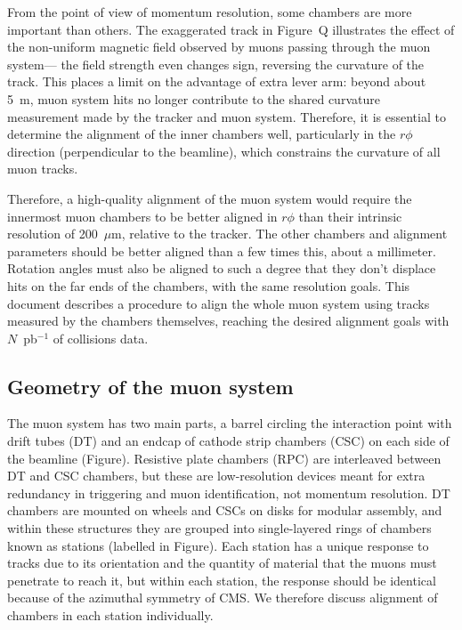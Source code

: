 \documentclass[12pt]{article}
\begin{document}
From the point of view of momentum resolution, some chambers are more
important than others.  The exaggerated track in Figure~Q illustrates
the effect of the non-uniform magnetic field observed by muons passing
through the muon system--- the field strength even changes sign,
reversing the curvature of the track.  This places a limit on the
advantage of extra lever arm: beyond about 5~m, muon system hits no
longer contribute to the shared curvature measurement made by the
tracker and muon system.  Therefore, it is essential to determine the
alignment of the inner chambers well, particularly in the $r\phi$
direction (perpendicular to the beamline), which constrains the
curvature of all muon tracks.

Therefore, a high-quality alignment of the muon system would require
the innermost muon chambers to be better aligned in $r\phi$ than their
intrinsic resolution of 200~$\mu$m, relative to the tracker.  The
other chambers and alignment parameters should be better aligned than
a few times this, about a millimeter.  Rotation angles must also be
aligned to such a degree that they don't displace hits on the far ends
of the chambers, with the same resolution goals.  This document
describes a procedure to align the whole muon system using tracks
measured by the chambers themselves, reaching the desired alignment
goals with $N$~pb$^{-1}$ of collisions data.

\subsection{Geometry of the muon system}

The muon system has two main parts, a barrel circling the interaction
point with drift tubes (DT) and an endcap of cathode strip chambers
(CSC) on each side of the beamline (Figure).  Resistive plate chambers
(RPC) are interleaved between DT and CSC chambers, but these are
low-resolution devices meant for extra redundancy in triggering and
muon identification, not momentum resolution.  DT chambers are mounted
on wheels and CSCs on disks for modular assembly, and within these
structures they are grouped into single-layered rings of chambers
known as stations (labelled in Figure).  Each station has a unique
response to tracks due to its orientation and the quantity of
material that the muons must penetrate to reach it, but within each
station, the response should be identical because of the azimuthal
symmetry of CMS.  We therefore discuss alignment of chambers in each
station individually.
\end{document}
